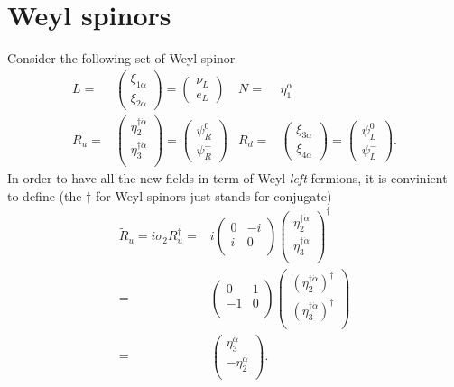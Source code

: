 \section{Weyl spinors}
Consider the following set of Weyl spinor
\begin{align*}
  L=&
  \begin{pmatrix}
  \xi_{1\alpha}\\
  \xi_{2\alpha}
  \end{pmatrix}
  =
  \begin{pmatrix}
  \nu_L\\
  e_L    
  \end{pmatrix}&
  N=&\eta_1^{\alpha} \nonumber\\
  R_u=&
  \begin{pmatrix}
  \eta_2^{\dagger\dot{\alpha}}\\
  \eta_3^{\dagger\dot{\alpha}}\\
  \end{pmatrix}
  =
  \begin{pmatrix}
   \psi_R^0\\
   \psi_R^-    
  \end{pmatrix}&R_d=&
  \begin{pmatrix}
       \xi_{3\alpha}\\
       \xi_{4\alpha}
  \end{pmatrix}=
  \begin{pmatrix}
      \psi_L^0\\
      \psi_L^-    
  \end{pmatrix}
.\end{align*}
In order to have all the new fields in term of Weyl \emph{left}-fermions, it is convinient to define (the $\dagger$ for Weyl spinors just stands for conjugate)  
\begin{align}
  \widetilde{R}_u= i\sigma_2 R_u^{\dagger}=&i
  \begin{pmatrix}
    0 &-i\\
    i & 0\\
  \end{pmatrix}\begin{pmatrix}
  \eta_2^{\dagger\dot{\alpha}}\\
  \eta_3^{\dagger\dot{\alpha}}\\
  \end{pmatrix}^{\dagger}\nonumber\\
=&
  \begin{pmatrix}
    0 &1\\
    -1 & 0\\
  \end{pmatrix}  \begin{pmatrix}
 \left(   \eta_2^{\dagger\dot{\alpha}} \right)^{\dagger}\\
  \left( \eta_3^{\dagger\dot{\alpha}} \right)^{\dagger}\\
  \end{pmatrix}\nonumber\\
=&\begin{pmatrix}
  \eta_3^{\alpha}\\
  -\eta_2^\alpha\\
  \end{pmatrix}.
 \end{align}


